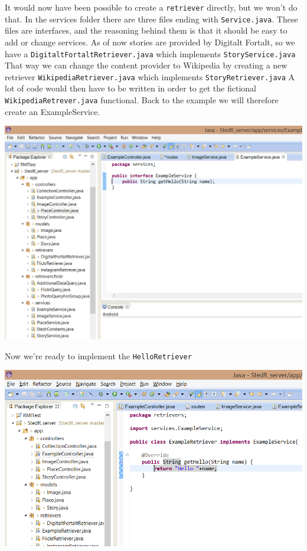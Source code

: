 \documentclass[11pt,a4paper,oneside]{article}
\begin{document}
It would now have been possible to create a \texttt{retriever} directly, but we won't do that. In the services folder there are three files ending with  \texttt{Service.java}. These files are interfaces, and the reasoning behind them is that it should be easy to add or change services. As of now stories are provided by Digitalt Fortalt, so we have a \texttt{DigitaltFortaltRetriever.java} which implements \texttt{StoryService.java} That way we can change the content provider to Wikipedia by creating a new retriever \texttt{WikipediaRetriever.java} which implements \texttt{StoryRetriever.java} A lot of code would then have to be written in order to get the fictional \texttt{WikipediaRetrever.java} functional. Back to the example we will therefore create an ExampleService. 

\begin{center}
\includegraphics[scale=0.7]{guide/eclipse4.png} 
\end{center}

Now we're ready to implement the \texttt{HelloRetriever}

\begin{center}
\includegraphics[scale=0.7]{guide/eclipse5.png} 
\end{center}
\end{document}
